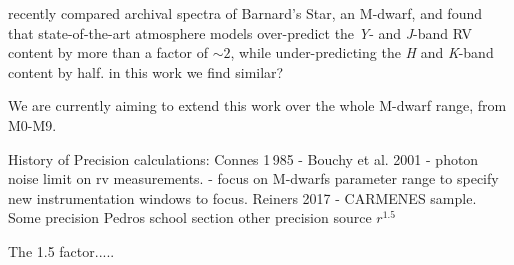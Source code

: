 

\citet{artigau_optical_2018} recently compared archival spectra of Barnard's Star, an {M-dwarf}, and found that state-of-the-art atmosphere models over-predict the \emph{Y}- and \emph{J}-band {RV} content by more than a factor of \(\sim 2\), while under-predicting the \emph{H} and \emph{K}-band content by half.
{\red{} in this work we find similar?}

We are currently aiming to extend this work over the whole {M-dwarf} range, from {M0}-{M9}.

History of Precision calculations:
Connes 1\,985 -
Bouchy et al.
2001  - photon noise limit on rv measurements.
\cite{figueira_radial_2016} - focus on {M-dwarfs} parameter range to specify new instrumentation windows to focus.
Reiners 2017 -  {CARMENES} sample.
Some precision
Pedros school section other precision source \({r}^{1.5}\)


The 1.5 factor.....


